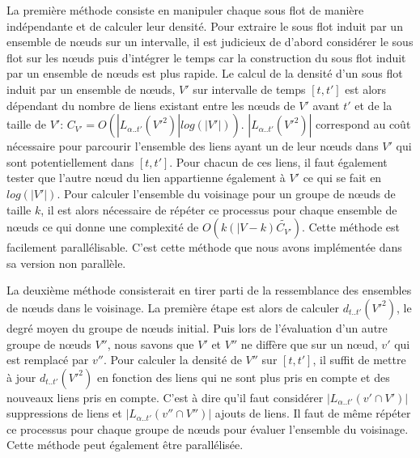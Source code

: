 La première méthode consiste en manipuler chaque sous flot de manière indépendante et de calculer leur densité.
Pour extraire le sous flot induit par un ensemble de n\oe uds sur un intervalle,
il est judicieux de d'abord considérer le sous flot sur les n\oe uds puis d'intégrer le temps  car la construction du sous flot induit par un ensemble de n\oe uds est plus rapide.
Le calcul de la densité d'un sous flot induit par un ensemble de n\oe uds, $V'$ sur intervalle de temps $[t,t']$ est alors dépendant du nombre de liens existant entre les n\oe uds de $V'$ avant $t'$ et de la taille de $V'$: $C_{V'}=O(|L_{\alpha..t'}(V'^2)|log(|V'|))$.
$|L_{\alpha..t'}(V'^2)|$ correspond au coût nécessaire pour parcourir l'ensemble des liens ayant un de leur n\oe uds dans $V'$  qui sont potentiellement dans $[t,t']$.
Pour chacun de ces liens, il faut également tester que l'autre n\oe ud du lien appartienne également à $V'$ ce qui se fait en $log(|V'|)$.
Pour calculer l'ensemble du voisinage pour un groupe de n\oe uds de taille $k$, il est alors nécessaire de répéter ce processus pour chaque ensemble de n\oe uds ce qui donne une complexité de $O(k(|V-k) \tilde{C_{V'}})$.
Cette méthode est facilement parallélisable.
C'est cette méthode que nous avons implémentée dans sa version non parallèle.

La deuxième méthode consisterait en tirer parti de la ressemblance des ensembles de n\oe uds dans le voisinage.
La première étape est alors de calculer $d_{t..t'}(V'^2)$, le degré moyen du groupe de n\oe uds initial.
Puis lors de l'évaluation d'un autre groupe de n\oe uds $V''$, nous savons que $V'$ et $V''$ ne diffère que sur un n\oe ud, $v'$ qui est remplacé par $v''$.
Pour calculer la densité de $V''$ sur $[t,t']$, il suffit de mettre à jour $d_{t..t'}(V'^2)$ en fonction des liens qui ne sont plus pris en compte et des nouveaux liens pris en compte.
C'est à dire qu'il faut considérer $|L_{\alpha..t'}({v'} \cap V')|$ suppressions de liens et  $|L_{\alpha..t'}({v''} \cap V'')|$ ajouts de liens.
Il faut de même répéter ce processus pour chaque groupe de n\oe uds pour évaluer l'ensemble du voisinage.
Cette méthode peut également être parallélisée.


